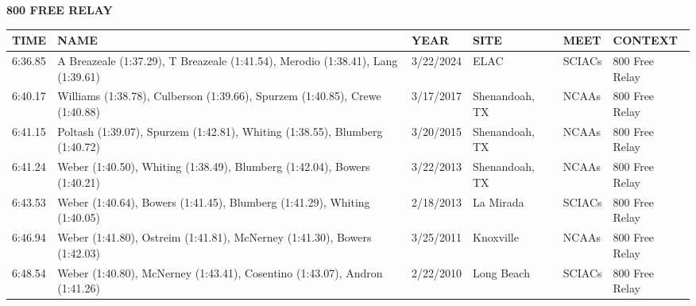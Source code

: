 \vspace{0.4cm}

\begin{center}
\begin{minipage}[t]{0.7\textwidth}
\centering
\textbf{800 FREE RELAY}\\[0.05cm]
\begin{tabular}{@{}p{1.8cm}p{2.8cm}p{1.2cm}p{1.4cm}p{1.4cm}p{2.0cm}@{}}
\hline
\textbf{TIME} & \textbf{NAME} & \textbf{YEAR} & \textbf{SITE} & \textbf{MEET} & \textbf{CONTEXT} \\
\hline
6:36.85 & A Breazeale (1:37.29), T Breazeale (1:41.54), Merodio (1:38.41), Lang (1:39.61) & 3/22/2024 & ELAC & SCIACs & 800 Free Relay \\
6:40.17 & Williams (1:38.78), Culberson (1:39.66), Spurzem (1:40.85), Crewe (1:40.88) & 3/17/2017 & Shenandoah, TX & NCAAs & 800 Free Relay \\
6:41.15 & Poltash (1:39.07), Spurzem (1:42.81), Whiting (1:38.55), Blumberg (1:40.72) & 3/20/2015 & Shenandoah, TX & NCAAs & 800 Free Relay \\
6:41.24 & Weber (1:40.50), Whiting (1:38.49), Blumberg (1:42.04), Bowers (1:40.21) & 3/22/2013 & Shenandoah, TX & NCAAs & 800 Free Relay \\
6:43.53 & Weber (1:40.64), Bowers (1:41.45), Blumberg (1:41.29), Whiting (1:40.05) & 2/18/2013 & La Mirada & SCIACs & 800 Free Relay \\
6:46.94 & Weber (1:41.80), Ostreim (1:41.81), McNerney (1:41.30), Bowers (1:42.03) & 3/25/2011 & Knoxville & NCAAs & 800 Free Relay \\
6:48.54 & Weber (1:40.80), McNerney (1:43.41), Cosentino (1:43.07), Andron (1:41.26) & 2/22/2010 & Long Beach & SCIACs & 800 Free Relay \\
\hline
\end{tabular}
\end{minipage}
\end{center}

\vspace{0.4cm}

